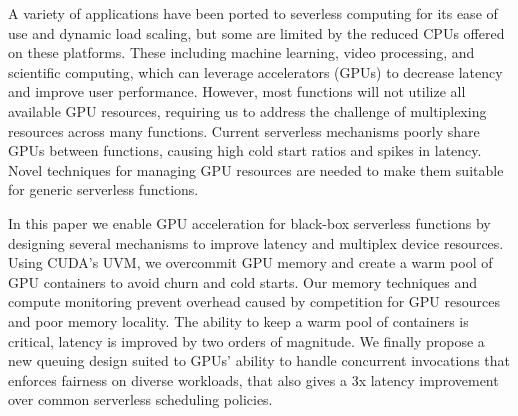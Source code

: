 A variety of applications have been ported to severless computing for its ease of use and dynamic load scaling, but some are limited by the reduced CPUs offered on these platforms.
These including machine learning, video processing, and scientific computing, which can leverage accelerators (GPUs) to decrease latency and improve user performance.
However, most functions will not utilize all available GPU resources, requiring us to address the challenge of multiplexing resources across many functions.
Current serverless mechanisms poorly share GPUs between functions, causing high cold start ratios and spikes in latency.
Novel techniques for managing GPU resources are needed to make them suitable for generic serverless functions.

In this paper we enable GPU acceleration for black-box serverless functions by designing several mechanisms to improve latency and multiplex device resources.
Using CUDA's UVM, we overcommit GPU memory and create a warm pool of GPU containers to avoid churn and cold starts.
Our memory techniques and compute monitoring prevent overhead caused by competition for GPU resources and poor memory locality.
The ability to keep a warm pool of containers is critical, latency is improved by two orders of magnitude.
We finally propose a new queuing design suited to GPUs' ability to handle concurrent invocations that enforces fairness on diverse workloads, that also gives a 3x latency improvement over common serverless scheduling policies.
